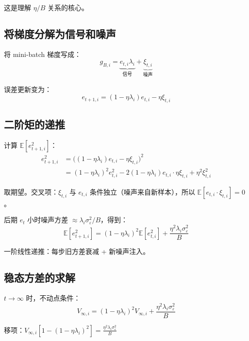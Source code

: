 \documentclass[12pt, a4paper]{ctexart}
\begin{document}
这是理解 $\eta/B$ 关系的核心。

\subsection{将梯度分解为信号和噪声}

将 mini-batch 梯度写成：
\begin{equation}
    g_{B,i} = \underbrace{e_{t,i} \lambda_i}_{\text{信号}} + \underbrace{\xi_{t,i}}_{\text{噪声}}
\end{equation}

误差更新变为：
\begin{equation}
    e_{t+1,i} = (1 - \eta\lambda_i) e_{t,i} - \eta \xi_{t,i}
\end{equation}

\subsection{二阶矩的递推}

计算 $\mathbb{E}[e_{t+1,i}^2]$：
\begin{align}
    e_{t+1,i}^2 &= \bigl((1-\eta\lambda_i) e_{t,i} - \eta\xi_{t,i}\bigr)^2 \\
    &= (1-\eta\lambda_i)^2 e_{t,i}^2 - 2(1-\eta\lambda_i) e_{t,i} \cdot \eta\xi_{t,i} + \eta^2 \xi_{t,i}^2
\end{align}

取期望。交叉项：$\xi_{t,i}$ 与 $e_{t,i}$ 条件独立（噪声来自新样本），所以 $\mathbb{E}[e_{t,i} \cdot \xi_{t,i}] = 0$。

后期 $e_t$ 小时噪声方差 $\approx \lambda_i\sigma_\varepsilon^2/B$，得到：
\begin{equation}
    \boxed{\mathbb{E}[e_{t+1,i}^2] = (1-\eta\lambda_i)^2 \mathbb{E}[e_{t,i}^2] + \frac{\eta^2 \lambda_i \sigma_\varepsilon^2}{B}}
\end{equation}

一阶线性递推：每步旧方差衰减 + 新噪声注入。

\subsection{稳态方差的求解}

$t \to \infty$ 时，不动点条件：
\begin{equation}
    V_{\infty,i} = (1-\eta\lambda_i)^2 V_{\infty,i} + \frac{\eta^2 \lambda_i \sigma_\varepsilon^2}{B}
\end{equation}

移项：$V_{\infty,i} [1 - (1-\eta\lambda_i)^2] = \frac{\eta^2 \lambda_i \sigma_\varepsilon^2}{B}$
\end{document}

